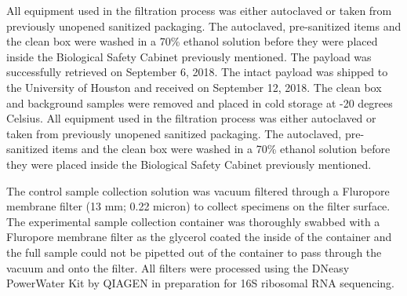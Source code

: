  All equipment used in the filtration process was either autoclaved or taken from previously unopened sanitized packaging. The autoclaved, pre-sanitized items and the clean box were washed in a 70\% ethanol solution before they were placed inside the Biological Safety Cabinet previously mentioned. 
 The payload was successfully retrieved on September 6, 2018. The intact payload was shipped to the University of Houston and received on September 12, 2018. The clean box and background samples were removed and placed in cold storage at -20 degrees Celsius. All equipment used in the filtration process was either autoclaved or taken from previously unopened sanitized packaging. The autoclaved, pre-sanitized items and the clean box were washed in a 70\% ethanol solution before they were placed inside the Biological Safety Cabinet previously mentioned. 
 
The control sample collection solution was vacuum filtered through a Fluropore membrane filter (13 mm; 0.22 micron) to collect specimens on the filter surface. The experimental sample collection container was thoroughly swabbed with a Fluropore membrane filter as the glycerol coated the inside of the container and the full sample could not be pipetted out of the container to pass through the vacuum and onto the filter. All filters were processed using the DNeasy PowerWater Kit by QIAGEN \cite{PowerWaterKit} in preparation for 16S ribosomal RNA sequencing.   









